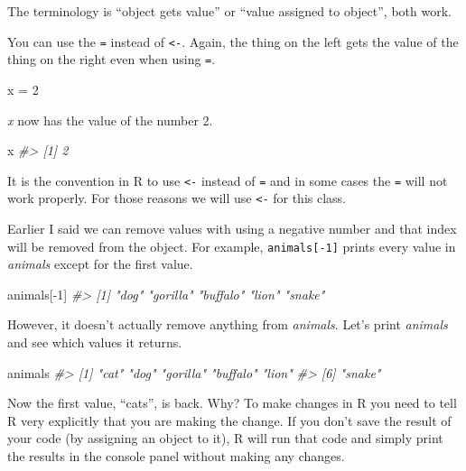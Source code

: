 \documentclass[
  12pt,
  openany]{book}
\newenvironment{Shaded}{\begin{snugshade}}{\end{snugshade}}
\newcommand{\CommentTok}[1]{\textcolor[rgb]{0.37,0.37,0.37}{\textit{#1}}}
\newcommand{\DecValTok}[1]{\textcolor[rgb]{0.06,0.06,0.06}{#1}}
\newcommand{\NormalTok}[1]{#1}
\newcommand{\OtherTok}[1]{\textcolor[rgb]{0.37,0.37,0.37}{#1}}
\newcommand{\SpecialCharTok}[1]{\textcolor[rgb]{0,0,0}{#1}}
\begin{document}
The terminology is ``object gets value'' or ``value assigned to object'', both work.

You can use the \texttt{=} instead of \texttt{\textless{}-}. Again, the thing on the left gets the value of the thing on the right even when using \texttt{=}.

\begin{Shaded}
\begin{Highlighting}[]
\NormalTok{x }\OtherTok{=} \DecValTok{2}
\end{Highlighting}
\end{Shaded}

\emph{x} now has the value of the number 2.

\begin{Shaded}
\begin{Highlighting}[]
\NormalTok{x}
\CommentTok{\#\textgreater{} [1] 2}
\end{Highlighting}
\end{Shaded}

It is the convention in R to use \texttt{\textless{}-} instead of \texttt{=} and in some cases the \texttt{=} will not work properly. For those reasons we will use \texttt{\textless{}-} for this class.

Earlier I said we can remove values with using a negative number and that index will be removed from the object. For example, \texttt{animals{[}-1{]}} prints every value in \emph{animals} except for the first value.

\begin{Shaded}
\begin{Highlighting}[]
\NormalTok{animals[}\SpecialCharTok{{-}}\DecValTok{1}\NormalTok{]}
\CommentTok{\#\textgreater{} [1] "dog"     "gorilla" "buffalo" "lion"    "snake"}
\end{Highlighting}
\end{Shaded}

However, it doesn't actually remove anything from \emph{animals}. Let's print \emph{animals} and see which values it returns.

\begin{Shaded}
\begin{Highlighting}[]
\NormalTok{animals}
\CommentTok{\#\textgreater{} [1] "cat"     "dog"     "gorilla" "buffalo" "lion"   }
\CommentTok{\#\textgreater{} [6] "snake"}
\end{Highlighting}
\end{Shaded}

Now the first value, ``cats'', is back. Why? To make changes in R you need to tell R very explicitly that you are making the change. If you don't save the result of your code (by assigning an object to it), R will run that code and simply print the results in the console panel without making any changes.
\end{document}

